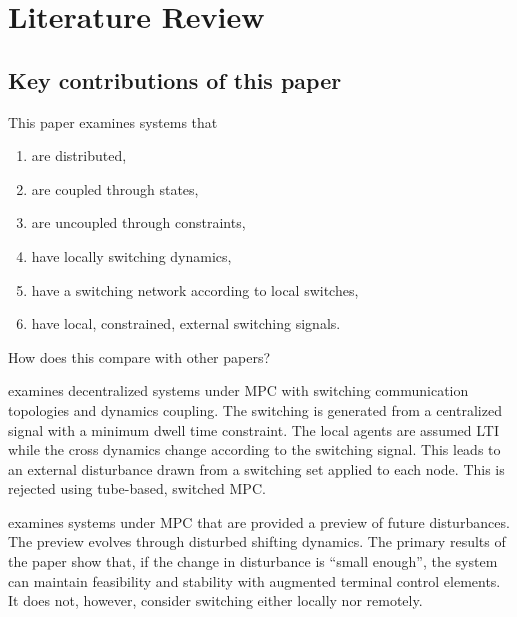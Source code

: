  \section{Literature Review}
 \subsection{Key contributions of this paper}
 This paper examines systems that
 \begin{enumerate}
 	\item are distributed,
 	\item are coupled through states,
 	\item are uncoupled through constraints,
 	\item have locally switching dynamics,
 	\item have a switching network according to local switches,
 	\item have local, constrained, external switching signals.
 \end{enumerate}
 How does this compare with other papers?

\cite{Ahandani2020} examines decentralized systems under MPC with switching communication topologies and dynamics coupling. The switching is generated from a centralized signal with a minimum dwell time constraint. The local agents are assumed LTI while the cross dynamics change according to the switching signal. This leads to an external disturbance drawn from a switching set applied to each node. This is rejected using tube-based, switched MPC. 

\cite{Monasterios2019} examines systems under MPC that are provided a preview of future disturbances. The preview evolves through disturbed shifting dynamics. The primary results of the paper show that, if the change in disturbance is ``small enough'', the system can maintain feasibility and stability with augmented terminal control elements. It does not, however, consider switching either locally nor remotely. 
 